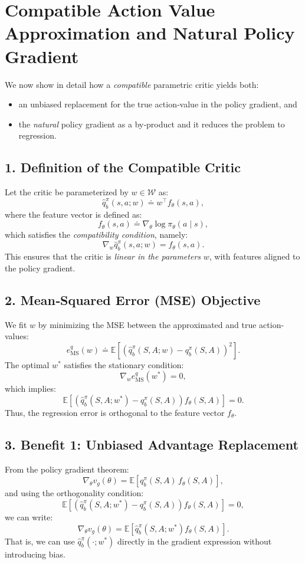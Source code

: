 \section{Compatible Action Value Approximation and Natural Policy Gradient}

We now show in detail how a \emph{compatible} parametric critic yields both:
\begin{itemize}
  \item an unbiased replacement for the true action‐value in the policy gradient, and
  \item the \emph{natural} policy gradient as a by‐product and it reduces the problem to regression.
\end{itemize}

\subsection*{1. Definition of the Compatible Critic}

Let the critic be parameterized by \( w \in \mathcal{W} \) as:
\[
\hat{q}_b^\pi(s,a;w) \doteq w^\top f_\theta(s,a),
\]
where the feature vector is defined as:
\[
f_\theta(s,a) \doteq \nabla_\theta \log \pi_\theta(a \mid s),
\]
which satisfies the \emph{compatibility condition}, namely:
\[
\nabla_w \hat{q}_b^\pi(s,a;w) = f_\theta(s,a).
\]
This ensures that the critic is \emph{linear in the parameters} \(w\), with features aligned to the policy gradient.

\subsection*{2. Mean‐Squared Error (MSE) Objective}

We fit \(w\) by minimizing the MSE between the approximated and true action-values:
\[
e_{\text{MS}}^q(w) \doteq \mathbb{E}\left[\left(\hat{q}_b^\pi(S,A;w) - q_b^\pi(S,A)\right)^2\right].
\]
The optimal \(w^*\) satisfies the stationary condition:
\[
\nabla_w e_{\text{MS}}^q(w^*) = 0,
\]
which implies:
\[
\mathbb{E}\left[(\hat{q}_b^\pi(S,A;w^*) - q_b^\pi(S,A)) f_\theta(S,A)\right] = 0.
\]
Thus, the regression error is orthogonal to the feature vector \(f_\theta\).

\subsection*{3. Benefit 1: Unbiased Advantage Replacement}

From the policy gradient theorem:
\[
\nabla_\theta v_g(\theta) = \mathbb{E}\left[q_b^\pi(S,A)\, f_\theta(S,A)\right],
\]
and using the orthogonality condition:
\[
\mathbb{E}\left[(\hat{q}_b^\pi(S,A;w^*) - q_b^\pi(S,A)) f_\theta(S,A)\right] = 0,
\]
we can write:
\[
\nabla_\theta v_g(\theta) 
= \mathbb{E}\left[\hat{q}_b^\pi(S,A;w^*) f_\theta(S,A)\right].
\]
That is, we can use \(\hat{q}_b^\pi(\cdot;w^*)\) directly in the gradient expression without introducing bias.

